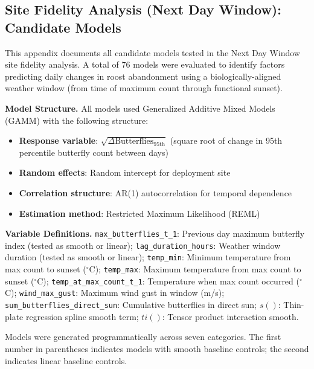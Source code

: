 \documentclass[insects,article,submit,pdftex,moreauthors]{Definitions/mdpi}
\begin{document}
\begin{appendix}
\section{Site Fidelity Analysis (Next Day Window): Candidate Models}
\label{app:sunset_models}

This appendix documents all candidate models tested in the Next Day Window site fidelity analysis. A total of 76 models were evaluated to identify factors predicting daily changes in roost abandonment using a biologically-aligned weather window (from time of maximum count through functional sunset).

\textbf{Model Structure.}
All models used Generalized Additive Mixed Models (GAMM) with the following structure:
\begin{itemize}
\item \textbf{Response variable}: $\sqrt{\Delta\text{Butterflies}_{95\text{th}}}$ (square root of change in 95th percentile butterfly count between days)
\item \textbf{Random effects}: Random intercept for deployment site
\item \textbf{Correlation structure}: AR(1) autocorrelation for temporal dependence
\item \textbf{Estimation method}: Restricted Maximum Likelihood (REML)
\end{itemize}

\textbf{Variable Definitions.}
\texttt{max\_butterflies\_t\_1}: Previous day maximum butterfly index (tested as smooth or linear);
\texttt{lag\_duration\_hours}: Weather window duration (tested as smooth or linear);
\texttt{temp\_min}: Minimum temperature from max count to sunset ($^{\circ}$C);
\texttt{temp\_max}: Maximum temperature from max count to sunset ($^{\circ}$C);
\texttt{temp\_at\_max\_count\_t\_1}: Temperature when max count occurred ($^{\circ}$C);
\texttt{wind\_max\_gust}: Maximum wind gust in window (m/s);
\texttt{sum\_butterflies\_direct\_sun}: Cumulative butterflies in direct sun;
$s()$: Thin-plate regression spline smooth term;
$ti()$: Tensor product interaction smooth.

Models were generated programmatically across seven categories. The first number in parentheses indicates models with smooth baseline controls; the second indicates linear baseline controls.


\end{appendix}
\end{document}
